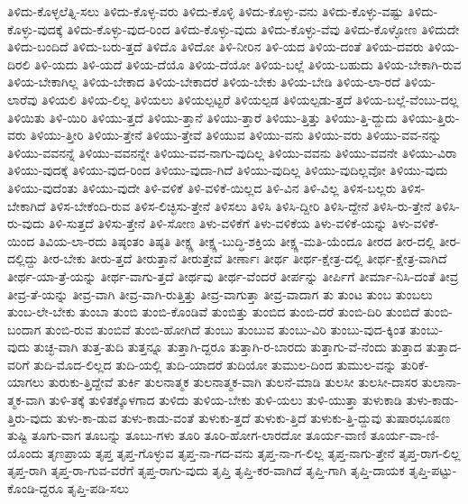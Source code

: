 {ತಿಳಿದು-ಕೊಳ್ಳಲೆತ್ನಿ-ಸಲು
ತಿಳಿದು-ಕೊಳ್ಳ-ವರು
ತಿಳಿದು-ಕೊಳ್ಳಿ
ತಿಳಿದು-ಕೊಳ್ಳು-ವನು
ತಿಳಿದು-ಕೊಳ್ಳು-ವಷ್ಟು
ತಿಳಿದು-ಕೊಳ್ಳು-ವುದಕ್ಕೆ
ತಿಳಿದು-ಕೊಳ್ಳು-ವುದ-ರಿಂದ
ತಿಳಿದು-ಕೊಳ್ಳು-ವುದು
ತಿಳಿದು-ಕೊಳ್ಳು-ವೆವು
ತಿಳಿದು-ಕೊಳ್ಳೋಣ
ತಿಳಿದುದೇ
ತಿಳಿದು-ಬಂದಿದೆ
ತಿಳಿದು-ಬರು-ತ್ತದೆ
ತಿಳಿದೊ
ತಿಳಿದೋ
ತಿಳಿ-ನೀರಿನ
ತಿಳಿ-ಯದ
ತಿಳಿಯ-ದಂತೆ
ತಿಳಿಯ-ದವರು
ತಿಳಿಯ-ದಿರಲಿ
ತಿಳಿ-ಯದು
ತಿಳಿ-ಯದೆ
ತಿಳಿಯ-ದೆಯೊ
ತಿಳಿಯ-ದೆಯೋ
ತಿಳಿಯ-ಬಲ್ಲೆ
ತಿಳಿಯ-ಬಹುದು
ತಿಳಿಯ-ಬೇಕಾಗಿ-ರುವ
ತಿಳಿಯ-ಬೇಕಾಗಿಲ್ಲ
ತಿಳಿಯ-ಬೇಕಾದ
ತಿಳಿಯ-ಬೇಕಾದರೆ
ತಿಳಿಯ-ಬೇಕು
ತಿಳಿಯ-ಬೇಡಿ
ತಿಳಿಯ-ಲಾ-ರದೆ
ತಿಳಿಯ-ಲಾರೆವು
ತಿಳಿಯಲಿ
ತಿಳಿಯ-ಲಿಲ್ಲ
ತಿಳಿಯಲು
ತಿಳಿಯಲ್ಪಟ್ಟರೆ
ತಿಳಿಯಲ್ಪಡ
ತಿಳಿಯಲ್ಪಡು-ತ್ತದೆ
ತಿಳಿಯ-ಬಲ್ಲೆ-ವೆಂಬು-ದಲ್ಲ
ತಿಳಿಯಿತು
ತಿಳಿ-ಯಿರಿ
ತಿಳಿಯು-ತ್ತದೆ
ತಿಳಿಯು-ತ್ತಾನೆ
ತಿಳಿಯು-ತ್ತಾರೆ
ತಿಳಿಯು-ತ್ತಿತ್ತು
ತಿಳಿಯು-ತ್ತಿ-ದ್ದುದು
ತಿಳಿಯು-ತ್ತಿರು-ವರು
ತಿಳಿಯು-ತ್ತೀರಿ
ತಿಳಿಯು-ತ್ತೇನೆ
ತಿಳಿಯು-ತ್ತೇವೆ
ತಿಳಿಯುವ
ತಿಳಿಯು-ವನು
ತಿಳಿಯು-ವರು
ತಿಳಿಯು-ವವ-ನನ್ನು
ತಿಳಿಯು-ವವನನ್ನೆ
ತಿಳಿಯು-ವವನನ್ನೇ
ತಿಳಿಯು-ವವ-ನಾಗು-ವುದಿಲ್ಲ
ತಿಳಿಯು-ವವನು
ತಿಳಿಯು-ವವನೇ
ತಿಳಿಯು-ವಿರಾ
ತಿಳಿಯು-ವುದಕ್ಕೆ
ತಿಳಿಯು-ವುದ-ರಿಂದ
ತಿಳಿಯು-ವುದಾ-ಗಿದೆ
ತಿಳಿಯು-ವುದಿಲ್ಲ
ತಿಳಿಯು-ವುದಿಲ್ಲವೋ
ತಿಳಿಯು-ವುದು
ತಿಳಿಯು-ವುದೆಂತು
ತಿಳಿಯು-ವುದೇ
ತಿಳಿ-ವಳಿಕೆ
ತಿಳಿ-ವಳಿಕೆ-ಯಿಲ್ಲದ
ತಿಳಿ-ವಿನ
ತಿಳಿ-ವಿಲ್ಲ
ತಿಳಿಸ-ಬಲ್ಲರು
ತಿಳಿಸ-ಬೇಕಾಗಿದೆ
ತಿಳಿಸ-ಬೇಕೆಂದಿ-ರುವ
ತಿಳಿಸ-ಲಿಚ್ಛಿಸು-ತ್ತೇನೆ
ತಿಳಿಸಲು
ತಿಳಿಸಿ
ತಿಳಿಸಿ-ದ್ದೀರಿ
ತಿಳಿಸಿ-ದ್ದೇನೆ
ತಿಳಿಸಿ-ರು-ತ್ತೇನೆ
ತಿಳಿಸಿ-ರು-ವುದು
ತಿಳಿ-ಸುತ್ತದೆ
ತಿಳಿಸು-ತ್ತೇನೆ
ತಿಳಿ-ಸೋಣ
ತಿಳು-ವಳಿಕೆಗೆ
ತಿಳು-ವಳಿಕೆಯ
ತಿಳು-ವಳಿಕೆ-ಯನ್ನು
ತಿಳು-ವಳಿಕೆ-ಯಿಂದ
ತಿವಿಯ-ಲಾ-ರದು
ತಿಷ್ಠಂತಂ
ತಿಷ್ಠತಿ
ತೀಕ್ಷ್ಣ
ತೀಕ್ಷ್ಣ-ಬುದ್ಧಿ-ಶಕ್ತಿಯ
ತೀಕ್ಷ್ಣ-ಮತಿ-ಯೆಂದೂ
ತೀರದ
ತೀರ-ದಲ್ಲಿ
ತೀರ-ದಲ್ಲಿದ್ದು
ತೀರ-ಬೇಕು
ತೀರು-ತ್ತದೆ
ತೀರುತ್ತಾನೆ
ತೀರುತ್ತೇವೆ
ತೀರ್ಣಾಃ
ತೀರ್ಥ
ತೀರ್ಥ-ಕ್ಷೇತ್ರ-ದಲ್ಲಿ
ತೀರ್ಥ-ಕ್ಷೇತ್ರ-ವಾಗಿದೆ
ತೀರ್ಥ-ಯಾ-ತ್ರೆ-ಯನ್ನು
ತೀರ್ಥ-ವಾಗು-ತ್ತದೆ
ತೀರ್ಥವು
ತೀರ್ಥ-ವೆಂದರೆ
ತೀರ್ಪನ್ನು
ತೀರ್ಪಿಗೆ
ತೀರ್ಮಾ-ನಿಸಿ-ದಂತೆ
ತೀವ್ರ
ತೀವ್ರ-ತೆ-ಯನ್ನು
ತೀವ್ರ-ವಾಗಿ
ತೀವ್ರ-ವಾಗಿ-ರುತ್ತಿತ್ತು
ತೀವ್ರ-ವಾಗುತ್ತಾ
ತೀವ್ರ-ವಾದಾಗ
ತು
ತುಂಟ
ತುಂಬ
ತುಂಬಲು
ತುಂಬ-ಲೇ-ಬೇಕು
ತುಂಬಾ
ತುಂಬಿ
ತುಂಬಿ-ಕೊಂಡಿವೆ
ತುಂಬಿತ್ತು
ತುಂಬಿದ
ತುಂಬಿ-ದರೆ
ತುಂಬಿ-ದಿರಿ
ತುಂಬಿದೆ
ತುಂಬಿ-ಬಂದಾಗ
ತುಂಬಿ-ರುವ
ತುಂಬಿವೆ
ತುಂಬಿ-ಹೋಗಿದೆ
ತುಂಬು
ತುಂಬುವ
ತುಂಬು-ವಿರಿ
ತುಂಬು-ವುದ-ಕ್ಕಿಂತ
ತುಂಬು-ವುದು
ತುಚ್ಛ-ವಾಗಿ
ತುತ್ತ-ತುದಿ
ತುತ್ತನ್ನೂ
ತುತ್ತಾಗಿ-ದ್ದರೂ
ತುತ್ತಾಗಿ-ರ-ಬಾರದು
ತುತ್ತಾಗು-ವೆ-ನೆಂದು
ತುತ್ತಾದ
ತುತ್ತಾದ-ವರಿಗೆ
ತುದಿ-ಮೊದ-ಲಿಲ್ಲದ
ತುದಿ-ಯಲ್ಲಿ
ತುದಿ-ಯಾದರೆ
ತುದಿಯೋ
ತುಮುಲ-ದಿಂದ
ತುಮುಲ-ವನ್ನು
ತುರಿಕೆ-ಯಾಗಲು
ತುರುಕು-ತ್ತಿದ್ದೇವೆ
ತುರ್ಕಿ
ತುಲನಾತ್ಮಕ
ತುಲನಾತ್ಮಕ-ವಾಗಿ
ತುಲನೆ-ಮಾಡಿ
ತುಲಸೀ
ತುಲಸೀ-ದಾಸರ
ತುಲಾನಾ-ತ್ಮಕ-ವಾಗಿ
ತುಳಿ-ತಕ್ಕೆ
ತುಳಿತಕ್ಕೊಳಗಾದ
ತುಳಿದು
ತುಳಿಯ-ಬೇಕು
ತುಳಿ-ಯಲು
ತುಳಿ-ಯುತ್ತಾ
ತುಳುಕಾಡಿ
ತುಳು-ಕಾಡು-ತ್ತಿರು-ವುದು
ತುಳು-ಕಾ-ಡುವ
ತುಳು-ಕಾಡು-ವಂತೆ
ತುಳುಕು-ತ್ತದೆ
ತುಳುಕು-ತ್ತಿದೆ
ತುಳುಕು-ತ್ತಿ-ದ್ದುವು
ತುಷಾರಭೂಷಣ
ತುಷ್ಟಿ
ತೂಗು-ವಾಗ
ತೂಬನ್ನು
ತೂಬು-ಗಳು
ತೂರಿ
ತೂರಿ-ಹೋಗ-ಲಾರದೋ
ತೂರ್ಯ-ವಾಣಿ
ತೂರ್ಯ-ವಾ-ಣಿ-ಯೊಂದು
ತೃಣಪ್ರಾಯ
ತೃಪ್ತ
ತೃಪ್ತ-ಗೊಳ್ಳುವ
ತೃಪ್ತ-ನಾ-ಗದ-ವನು
ತೃಪ್ತ-ನಾ-ಗ-ಲಿಲ್ಲ
ತೃಪ್ತ-ನಾಗು-ತ್ತೇನೆ
ತೃಪ್ತ-ರಾಗ-ಲಿಲ್ಲ
ತೃಪ್ತ-ರಾಗಿ
ತೃಪ್ತ-ರಾ-ಗುವ-ವರೆಗೆ
ತೃಪ್ತ-ರಾಗು-ವುದು
ತೃಪ್ತಿ
ತೃಪ್ತಿ-ಕರ-ವಾಗಿದೆ
ತೃಪ್ತಿ-ಗಾಗಿ
ತೃಪ್ತಿ-ದಾಯಕ
ತೃಪ್ತಿ-ಪಟ್ಟು-ಕೊಂಡಿ-ದ್ದರೂ
ತೃಪ್ತಿ-ಪಡಿ-ಸಲು
}
